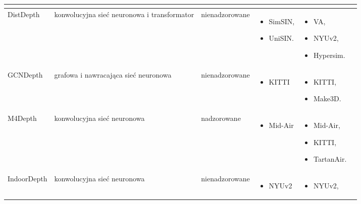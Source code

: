 \begin{table}[H]
{\begin{tabular}{ |l|p{2cm}|p{3cm}|p{5cm}|p{5cm}|r| }
\begin{itemize}
        \end{itemize}\\
        \hline
        DistDepth \cite{wu2022practical} &
        konwolucyjna sieć neuronowa i transformator &
        nienadzorowane &
        \begin{itemize}
            \item SimSIN,
            \item UniSIN.
        \end{itemize} & 
        \begin{itemize}
            \item VA,
            \item NYUv2,
            \item Hypersim.
        \end{itemize}\\
        \hline
        GCNDepth \cite{masoumian2021gcndepth} &
        grafowa i nawracająca sieć neuronowa &
        nienadzorowane &
        \begin{itemize}
            \item KITTI
        \end{itemize} & 
        \begin{itemize}
            \item KITTI,
            \item Make3D.
        \end{itemize}\\
        \hline
        M4Depth \cite{fonder2023technique} &
        konwolucyjna sieć neuronowa &
        nadzorowane &
        \begin{itemize}
            \item Mid-Air
        \end{itemize} & 
        \begin{itemize}
            \item Mid-Air,
            \item KITTI,
            \item TartanAir.
        \end{itemize}\\
        \hline
        IndoorDepth \cite{fan2023deeper} &
        konwolucyjna sieć neuronowa &
        nienadzorowane &
        \begin{itemize}
            \item NYUv2
        \end{itemize} & 
        \begin{itemize}
            \item NYUv2,

\end{itemize}
\end{tabular}}
\end{table}
